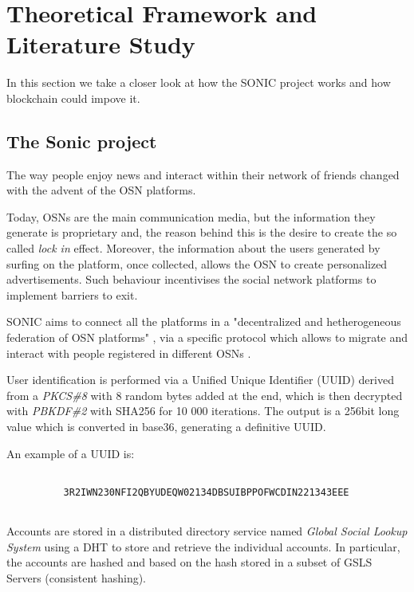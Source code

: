 \section{Theoretical Framework and Literature Study}
\label{S:2}

In this section we take a closer look at how the SONIC project works and how blockchain could impove it. 

\subsection{The Sonic project}

The way people enjoy news and interact within their network of friends changed with the advent of the OSN platforms. \par
Today, OSNs are the main communication media, but the information they generate is proprietary and, the reason behind this is the desire to create the so called \textit{lock in} effect.
Moreover, the information about the users generated by surfing on the platform, once collected, allows the OSN to create personalized advertisements. Such behaviour incentivises the social network platforms to implement barriers to exit. \par
SONIC aims to connect all the platforms in a "decentralized and hetherogeneous federation of OSN platforms" \cite{gondor_distributed_2016}, via a specific protocol which allows to migrate and interact with people registered in different OSNs \cite{gondor_sonic:_2014}. \par
User identification is performed via a Unified Unique Identifier (UUID) derived from a \textit{PKCS\#8} \cite{pkcs8}with 8 random bytes added at the end, which is then decrypted with \textit{PBKDF\#2} \cite{pkcs8} with SHA256 \cite{hansen_us} for 10 000 iterations.
The output is a 256bit long value which is converted in base36, generating a definitive UUID. \par

An example of a UUID \cite{gondor_sonic:_2014} is: 

\begin{verbatim}

          3R2IWN230NFI2QBYUDEQW02134DBSUIBPPOFWCDIN221343EEE
    
\end{verbatim}

\par

Accounts are stored in a distributed directory service named \textit{Global Social Lookup System} using a DHT to store and retrieve the individual accounts. In particular, the accounts are hashed and based on the hash stored in a subset of GSLS Servers (consistent hashing). \par

